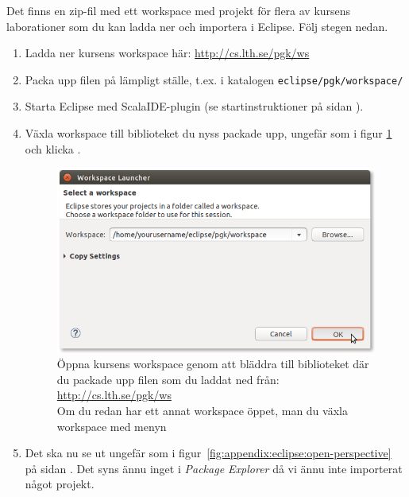 Det finns en zip-fil med ett workspace med projekt för flera av kursens laborationer som du kan ladda ner och importera i Eclipse. Följ stegen nedan.

\begin{enumerate}
\item Ladda ner kursens workspace här: \url{http://cs.lth.se/pgk/ws}

\item Packa upp filen på lämpligt ställe, t.ex. i katalogen \texttt{eclipse/pgk/workspace/}

\item Starta Eclipse med ScalaIDE-plugin (se startinstruktioner på sidan \pageref{subsubsection:start:eclipse}).

\item Växla workspace till biblioteket du nyss packade upp, ungefär som i figur \ref{fig:eclipse:ide:open} och klicka .

\begin{figure}[H]
\centering
\includegraphics[width=1.0\textwidth]{../img/eclipse/eclipse-select-workspace.png}
\caption {Öppna kursens workspace genom att bläddra till biblioteket där du packade upp filen som du laddat ned från: \url{http://cs.lth.se/pgk/ws} \\Om du redan har ett annat workspace öppet, man du växla workspace med menyn }
\label{fig:eclipse:ide:open}
\end{figure}

\item
Det ska nu se ut ungefär som i figur~\ref{fig:appendix:eclipse:open-perspective} på sidan \pageref{fig:appendix:eclipse:open-perspective}. Det syns ännu inget i \textit{Package Explorer} då vi ännu inte importerat något projekt.


\end{enumerate}
